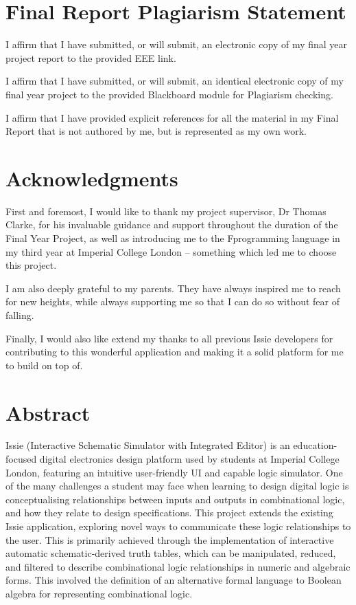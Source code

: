\clearpage
{}

\section*{\centering Final Report Plagiarism Statement}

I affirm that I have submitted, or will submit, an electronic copy of my final year project report to the provided EEE link.

I affirm that I have submitted, or will submit, an identical electronic copy of my final year project to the provided Blackboard module for Plagiarism checking.

I affirm that I have provided explicit references for all the material in my Final Report that is not authored by me, but is represented as my own work.

\newpage

\section*{\centering Acknowledgments}
First and foremost, I would like to thank my project supervisor, Dr Thomas Clarke, for his invaluable guidance and support throughout the duration of the Final Year Project, as well as introducing me to the F\fsharp programming language in my third year at Imperial College London -- something which led me to choose this project.

I am also deeply grateful to my parents. They have always inspired me to reach for new heights, while always supporting me so that I can do so without fear of falling.

Finally, I would also like extend my thanks to all previous Issie developers for contributing to this wonderful application and making it a solid platform for me to build on top of.

\newpage

\section*{\centering Abstract}
Issie (Interactive Schematic Simulator with Integrated Editor) is an education-focused digital electronics design platform used by students at Imperial College London, featuring an intuitive user-friendly UI and capable logic simulator. One of the many challenges a student may face when learning to design digital logic is conceptualising relationships between inputs and outputs in combinational logic, and how they relate to design specifications. This project extends the existing Issie application, exploring novel ways to communicate these logic relationships to the user. This is primarily achieved through the implementation of interactive automatic schematic-derived truth tables, which can be manipulated, reduced, and filtered to describe combinational logic relationships in numeric and algebraic forms. This involved the definition of an alternative formal language to Boolean algebra for representing combinational logic. 

